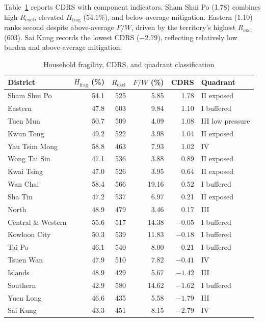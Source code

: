 \documentclass[11pt,a4paper]{article}
\begin{document}
Table~\ref{tab:cdrs} reports CDRS with component indicators. Sham Shui Po (1.78) combines high $R_{\mathrm{excl}}$, elevated $H_{\mathrm{frag}}$ (54.1\%), and below-average mitigation. Eastern (1.10) ranks second despite above-average $F/W$, driven by the territory's highest $R_{\mathrm{excl}}$ (603). Sai Kung records the lowest CDRS ($-2.79$), reflecting relatively low burden and above-average mitigation.

\begin{table}[H]
\centering
\caption{Household fragility, CDRS, and quadrant classification}
\label{tab:cdrs}
\small
\begin{tabular}{@{}lrrrrl@{}}
\toprule
District & $H_{\mathrm{frag}}$ (\%) & $R_{\mathrm{excl}}$ & $F/W$ (\%) & CDRS & Quadrant \\
\midrule
Sham Shui Po & 54.1 & 525 & 5.85 & 1.78 & II exposed \\
Eastern & 47.8 & 603 & 9.84 & 1.10 & I buffered \\
Tuen Mun & 50.7 & 509 & 4.09 & 1.08 & III low pressure \\
Kwun Tong & 49.2 & 522 & 3.98 & 1.04 & II exposed \\
Yau Tsim Mong & 58.8 & 463 & 7.93 & 1.02 & IV \\
Wong Tai Sin & 47.1 & 536 & 3.88 & 0.89 & II exposed \\
Kwai Tsing & 47.0 & 526 & 3.95 & 0.64 & II exposed \\
Wan Chai & 58.4 & 566 & 19.16 & 0.52 & I buffered \\
Sha Tin & 47.2 & 537 & 6.97 & 0.21 & II exposed \\
North & 48.9 & 479 & 3.46 & 0.17 & III \\
Central \& Western & 55.6 & 517 & 14.38 & $-0.05$ & I buffered \\
Kowloon City & 50.3 & 539 & 11.83 & $-0.18$ & I buffered \\
Tai Po & 46.1 & 540 & 8.00 & $-0.21$ & I buffered \\
Tsuen Wan & 47.9 & 510 & 7.82 & $-0.41$ & IV \\
Islands & 48.9 & 429 & 5.67 & $-1.42$ & III \\
Southern & 42.9 & 580 & 14.62 & $-1.62$ & I buffered \\
Yuen Long & 46.6 & 435 & 5.58 & $-1.79$ & III \\
Sai Kung & 43.3 & 451 & 8.15 & $-2.79$ & IV \\
\bottomrule
\end{tabular}
\end{table}
\end{document}

